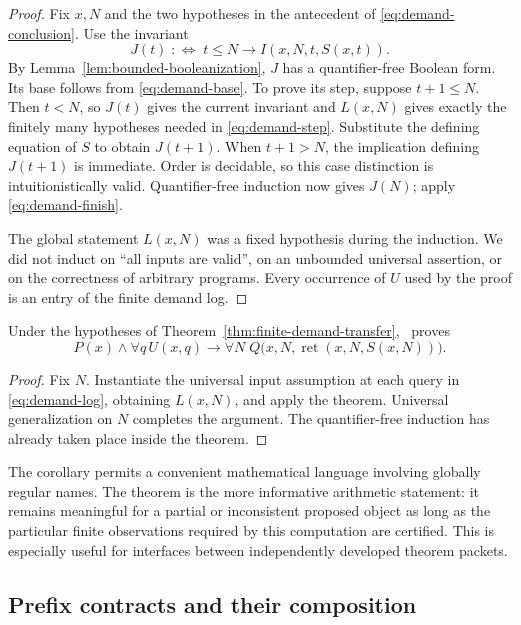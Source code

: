 \begin{proof}
Fix $x,N$ and the two hypotheses in the antecedent of
\eqref{eq:demand-conclusion}.  Use the invariant
\[
 J(t)\;:\!\Longleftrightarrow\;
 t\le N\longrightarrow I(x,N,t,S(x,t)).
\]
By Lemma~\ref{lem:bounded-booleanization}, $J$ has a quantifier-free Boolean
form.  Its base follows from \eqref{eq:demand-base}.  To prove its step,
suppose $t+1\le N$.  Then $t<N$, so $J(t)$ gives the current invariant and
$L(x,N)$ gives exactly the finitely many hypotheses needed in
\eqref{eq:demand-step}.  Substitute the defining equation of $S$ to obtain
$J(t+1)$.  When $t+1>N$, the implication defining $J(t+1)$ is immediate.
Order is decidable, so this case distinction is intuitionistically valid.
Quantifier-free induction now gives $J(N)$; apply
\eqref{eq:demand-finish}.

The global statement $L(x,N)$ was a fixed hypothesis during the induction.
We did not induct on ``all inputs are valid'', on an unbounded universal
assertion, or on the correctness of arbitrary programs.  Every occurrence of
$U$ used by the proof is an entry of the finite demand log.
\end{proof}

\begin{corollary}
\label{cor:global-to-local}
Under the hypotheses of Theorem~\ref{thm:finite-demand-transfer}, \ipra\ proves
\[
 P(x)\land\forall q\,U(x,q)
 \longrightarrow
 \forall N\;Q\bigl(x,N,\operatorname{ret}(x,N,S(x,N))\bigr).
\]
\end{corollary}

\begin{proof}
Fix $N$.  Instantiate the universal input assumption at each query in
\eqref{eq:demand-log}, obtaining $L(x,N)$, and apply the theorem.  Universal
generalization on $N$ completes the argument.  The quantifier-free induction
has already taken place inside the theorem.
\end{proof}

The corollary permits a convenient mathematical language involving globally
regular names.  The theorem is the more informative arithmetic statement:
it remains meaningful for a partial or inconsistent proposed object as long
as the particular finite observations required by this computation are
certified.  This is especially useful for interfaces between independently
developed theorem packets.

\subsection{Prefix contracts and their composition}

